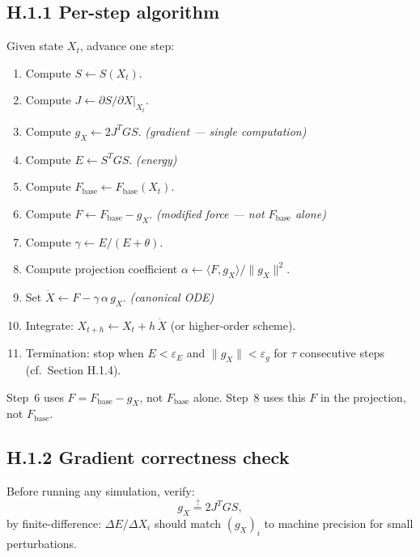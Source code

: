 \documentclass[11pt,oneside]{amsart}
\def\S{Section }%
\def\quad{ }%
\def\textbf#1{#1}%
\theoremstyle{plain}
\theoremstyle{definition}
\newcommand{\Xdot}{\dot{X}}
\newcommand{\gX}{g_X}
\newcommand{\Fbase}{F_{\mathrm{base}}}
\begin{document}
\subsection*{H.1.1 \quad Per-step algorithm}

Given state $X_{t}$, advance one step:

\begin{enumerate}[leftmargin=2em, label=\textbf{\arabic*.}]
  \item Compute $S \leftarrow S(X_{t})$.
  \item Compute $J \leftarrow \partial S/\partial X\big|_{X_{t}}$.
  \item Compute $\gX \leftarrow 2J^{T}GS$.  \hfill
        \textit{(gradient --- \textbf{single computation})}
  \item Compute $E \leftarrow S^{T}GS$.    \hfill
        \textit{(energy)}
  \item Compute $\Fbase \leftarrow \Fbase(X_{t})$.
  \item Compute $F \leftarrow \Fbase - \gX$.   \hfill
        \textit{(modified force --- \textbf{not} $\Fbase$ alone)}
  \item Compute $\gamma \leftarrow E/(E+\theta)$.
  \item Compute projection coefficient $\alpha \leftarrow \langle F,\gX\rangle / \|\gX\|^{2}$.
  \item Set $\Xdot \leftarrow F - \gamma\,\alpha\,\gX$.
        \hfill \textit{(canonical ODE)}
  \item Integrate: $X_{t+h} \leftarrow X_{t} + h\,\Xdot$ (or higher-order scheme).
  \item \textbf{Termination:} stop when $E<\varepsilon_{E}$ and
        $\|\gX\|<\varepsilon_{g}$ for $\tau$ consecutive steps
        (cf.\ \S H.1.4).
\end{enumerate}

\begin{warnbox}
Step~6 uses $F = \Fbase - \gX$, not $\Fbase$ alone.
Step~8 uses this $F$ in the projection, not $\Fbase$.
\end{warnbox}

\subsection*{H.1.2 \quad Gradient correctness check}

Before running any simulation, verify:
\[
  \gX \stackrel{?}{=} 2J^{T}GS,
\]
by finite-difference: $\Delta E / \Delta X_{i}$ should match $(\gX)_{i}$ to
machine precision for small perturbations.
\end{document}
